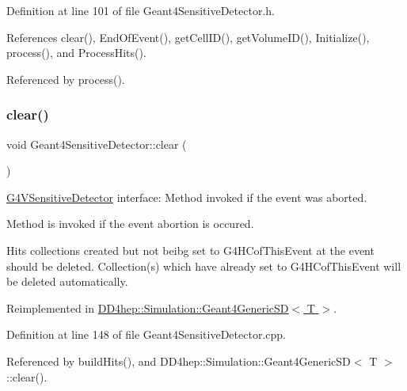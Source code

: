 Definition at line 101 of file Geant4\+Sensitive\+Detector.\+h.



References clear(), End\+Of\+Event(), get\+Cell\+I\+D(), get\+Volume\+I\+D(), Initialize(), process(), and Process\+Hits().



Referenced by process().

\hypertarget{class_d_d4hep_1_1_simulation_1_1_geant4_sensitive_detector_a594a8e0083028c98326f99ace2f0f8dd}{}\label{class_d_d4hep_1_1_simulation_1_1_geant4_sensitive_detector_a594a8e0083028c98326f99ace2f0f8dd} 
\subsubsection{\texorpdfstring{clear()}{clear()}}
{\footnotesize\ttfamily void Geant4\+Sensitive\+Detector\+::clear (\begin{DoxyParamCaption}{ }\end{DoxyParamCaption})\hspace{0.3cm}{\ttfamily [virtual]}}



\hyperlink{class_g4_v_sensitive_detector}{G4\+V\+Sensitive\+Detector} interface\+: Method invoked if the event was aborted. 

Method is invoked if the event abortion is occured.

Hits collections created but not beibg set to G4\+H\+Cof\+This\+Event at the event should be deleted. Collection(s) which have already set to G4\+H\+Cof\+This\+Event will be deleted automatically. 

Reimplemented in \hyperlink{class_d_d4hep_1_1_simulation_1_1_geant4_generic_s_d_acf8f9146d5683a8131fc5d8ee26d7f01}{D\+D4hep\+::\+Simulation\+::\+Geant4\+Generic\+S\+D$<$ T $>$}.



Definition at line 148 of file Geant4\+Sensitive\+Detector.\+cpp.



Referenced by build\+Hits(), and D\+D4hep\+::\+Simulation\+::\+Geant4\+Generic\+S\+D$<$ T $>$\+::clear().

\hypertarget{class_d_d4hep_1_1_simulation_1_1_geant4_sensitive_detector_a29e835271c9efa731bba49c64790281b}{}\label{class_d_d4hep_1_1_simulation_1_1_geant4_sensitive_detector_a29e835271c9efa731bba49c64790281b} 
